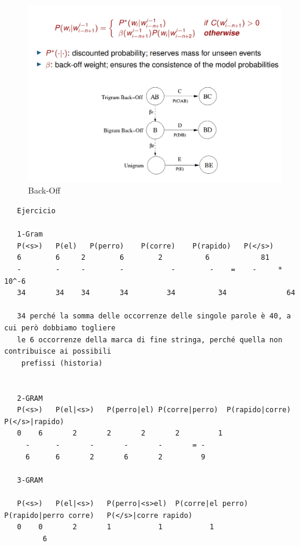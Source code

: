 \begin{figure}[htbp]
   \centering
   \includegraphics{images/07/ngramBackOff.png}
   \caption{Back-Off}
   \label{fig:07/ngramBackOff}
\end{figure}


\begin{verbatim}
   Ejercicio

   1-Gram
   P(<s>)	P(el)	P(perro)	P(corre)	P(rapido)	P(</s>)
   6        6     2        6        2	       6	        81
   -        -     -        -	       -        -    =    -     * 10^-6
   34       34    34       34	      34	      34		      64
   
   34 perché la somma delle occorrenze delle singole parole è 40, a cui però dobbiamo togliere 
   le 6 occorrenze della marca di fine stringa, perché quella non contribuisce ai possibili
    prefissi (historia)    

   
   2-GRAM
   P(<s>) 	P(el|<s>)	P(perro|el)	P(corre|perro)	P(rapido|corre)	P(</s>|rapido)
   0	6		2		2		2		2		  1
     -		-		-		-		-		= -		
     6		6		2		6		2		  9
   
   3-GRAM
   
   P(<s>)	P(el|<s>)	P(perro|<s>el)	P(corre|el perro)	P(rapido|perro corre)	P(</s>|corre rapido)
   0	0		2		1			1			1
         6

\end{verbatim}

